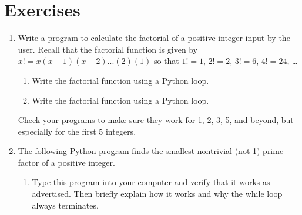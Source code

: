 \documentclass[letterpaper,10pt,english]{sphinxmanual}
\begin{document}
\section{Exercises}
\label{\detokenize{chap6/chap6_loopsconds:exercises}}\begin{enumerate}
%
\item {} 
\sphinxAtStartPar
Write a program to calculate the factorial of a positive integer input by the user.  Recall that the factorial function is given by \(x! = x (x-1) (x-2) ... (2) (1)\) so that \(1!=1\), \(2!=2\), \(3!=6\), \(4!=24\), …
\begin{enumerate}
%
\item {} 
\sphinxAtStartPar
Write the factorial function using a Python  loop.

\item {} 
\sphinxAtStartPar
Write the factorial function using a Python  loop.

\end{enumerate}

\sphinxAtStartPar
Check your programs to make sure they work for 1, 2, 3, 5, and beyond, but especially for the first 5 integers.

\item {} 
\sphinxAtStartPar
The following Python program finds the smallest non\sphinxhyphen{}trivial (not 1) prime factor of a positive integer.

\begin{sphinxVerbatim}[commandchars=\\\{\},numbers=left,firstnumber=1,stepnumber=1]
  
  

     
      

  
\end{sphinxVerbatim}
\begin{enumerate}
%
\item {} 
\sphinxAtStartPar
Type this program into your computer and verify that it works as advertised.  Then briefly explain how it works and why the while loop always terminates.


\end{enumerate}
\end{enumerate}
\end{document}

